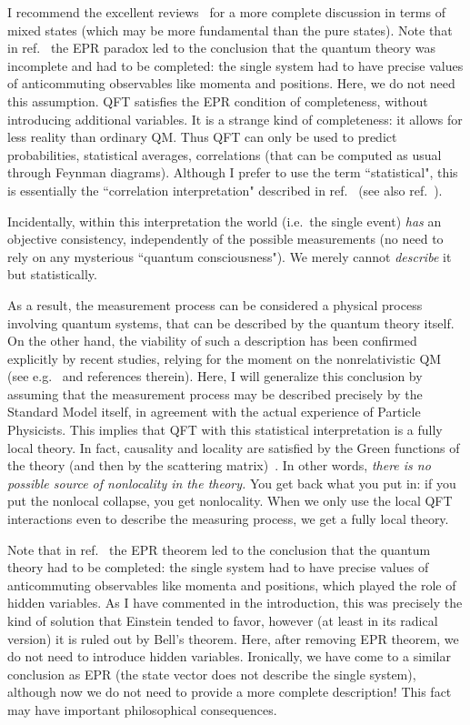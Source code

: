 \documentclass[published]{JHEP3}
\begin{document}
I recommend the excellent reviews~\cite{Ballentine70,Belinfante,BJ} for a more complete discussion
in terms of mixed states (which may be more fundamental than the
pure states). Note that in ref.~\cite{Ballentine70} the EPR
paradox led to the conclusion that the quantum theory was
incomplete and had to be completed: the single system had to have
precise values of anticommuting observables like momenta and
positions. Here, we do not need this assumption. QFT satisfies the
EPR condition of completeness, without introducing additional
variables. It is a strange kind of completeness: it allows for
less reality than ordinary QM. Thus QFT can only be used to
predict probabilities, statistical averages, correlations (that
can be computed as usual through Feynman diagrams). Although I
prefer to use the term ``statistical", this is essentially the
``correlation interpretation" described in ref.~\cite{Laloe} (see
also ref.~\cite{PeresFuchs}).

Incidentally, within this interpretation the world (i.e.\ the
single event) \emph{has} an objective consistency, independently of
the possible measurements (no need to rely on any mysterious
``quantum consciousness"). We merely cannot \emph{describe} it but
statistically.

As a result, the measurement process can be considered a physical
process involving quantum systems, that can be described by the
quantum theory itself. On the other hand, the viability of such a
description has been confirmed explicitly by recent studies,
relying for the moment on the nonrelativistic QM (see e.g.~\cite{Zeno} and references therein). Here, I will generalize this
conclusion by assuming that the measurement process may be
described precisely by the Standard Model itself, in agreement
with the actual experience of Particle Physicists. This implies
that {QFT with this statistical interpretation is a fully local
theory.} In fact, causality and locality are satisfied by the
Green functions of the theory (and then by the scattering matrix)~\cite{WeinbookI,WeinbookII}. In other words, \emph{there is no
possible source of nonlocality in the theory.} You get back what
you put in: if you put the nonlocal collapse, you get nonlocality.
When we only use the local QFT interactions even to describe the
measuring process, we get a fully local theory.

Note that in ref.~\cite{Ballentine70} the EPR theorem led to the
conclusion that the quantum theory had to be completed: the single
system had to have precise values of anticommuting observables
like momenta and positions, which played the role of hidden
variables. As I have commented in the introduction, this was
precisely the kind of solution that Einstein tended to favor,
however (at least in its radical version) it is ruled out by
Bell's theorem. Here, after removing EPR theorem, we do not need
to introduce hidden variables. Ironically, we have come to a
similar conclusion as EPR (the state vector does not describe the
single system), although now we do not need to provide a more
complete description! This fact may have important philosophical
consequences.
\end{document}
